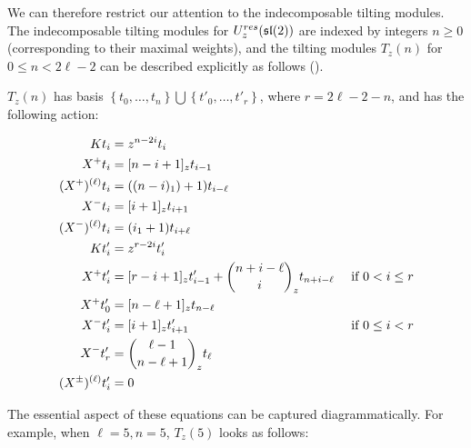 We can therefore restrict our attention to the indecomposable tilting modules.
The indecomposable tilting modules for $U_z^{res}(\mathfrak{sl}(2))$ are indexed by integers $n
\geq 0$ (corresponding to their maximal weights), and the tilting modules
$T_z(n)$ for $0 \leq n < 2\ell - 2$ can be described explicitly as follows
(\cite{CP}). 

$T_z(n)$ has basis $\left\{ t_0, \ldots, t_n \right\} \bigcup \left\{ t'_0,
    \ldots, t'_{r} \right\}$, where $r = 2\ell - 2 - n$, and has the following
    action:

\begin{align}
    Kt_i &= z^{n-2i} t_i \\
    X^+ t_i &= [n-i+1]_z t_{i-1} \\
    (X^+)^{(\ell)} t_i &= ((n-i)_1) + 1) t_{i-\ell} \\
    X^-t_i &= [i+1]_z t_{i+1} \\
    (X^-)^{(\ell)} t_i &= (i_1 + 1) t_{i+\ell} \\
    Kt'_i &= z^{r-2i} t'_i \\
    X^+ t'_i &= [r-i+1]_z t'_{i-1}  + \dbinom{n + i - \ell}{i}_z t_{n+i-\ell} &\text{ if $0 < i \leq r$}\\
    X^+ t'_0 &= [n - \ell + 1]_z t_{n-\ell} \\
    X^-t'_i &= [i+1]_z t'_{i+1} &\text{ if $0 \leq i < r$}\\
    X^- t'_r &= \dbinom{\ell - 1}{n - \ell + 1}_z t_\ell \\
    (X^\pm)^{(\ell)} t'_i  &= 0
\end{align}

The essential aspect of these equations can be captured diagrammatically. For
example, when $\ell = 5, n = 5$, $T_z(5)$ looks as follows:

